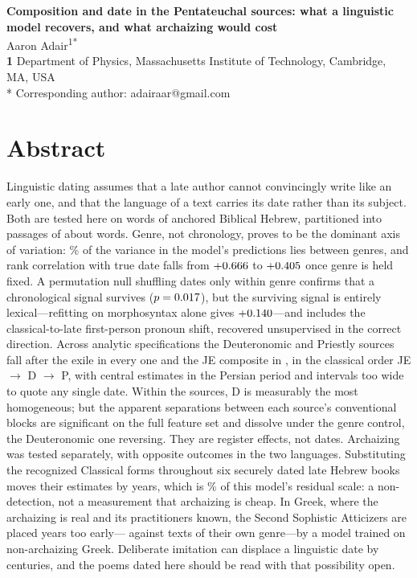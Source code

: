 \documentclass[10pt,letterpaper]{article}
\begin{document}
\vspace*{0.2in}

\begin{flushleft}
{\Large
\textbf{Composition and date in the Pentateuchal sources: what a linguistic
model recovers, and what archaizing would cost}
}
\newline
\\
Aaron Adair\textsuperscript{1*}
\\
\bigskip
\textbf{1} Department of Physics, Massachusetts Institute of Technology, Cambridge, MA, USA
\\
\bigskip
* Corresponding author: adairaar@gmail.com

\end{flushleft}

\section*{Abstract}

Linguistic dating assumes that a late author cannot convincingly write like an
early one, and that the language of a text carries its date rather than its
subject.  Both are tested here on \HBwords{} words of anchored Biblical Hebrew,
partitioned into \HBchunks{} passages of about \HBtarget{} words.  Genre, not chronology, proves to be the dominant axis
of variation: \GNbetween\% of the variance in the model's predictions lies
between genres, and rank correlation with true date falls from $+0.666$ to
$+0.405$ once genre is held fixed.  A permutation null shuffling dates
only within genre confirms that a chronological signal survives ($p =
0.017$), but the surviving signal is entirely lexical---refitting on
morphosyntax alone gives $+0.140$---and includes the classical-to-late
first-person pronoun shift, recovered unsupervised in the correct direction.
Across \SPpass{} analytic specifications the Deuteronomic and Priestly sources
fall after the exile in every one and the JE composite in \SPJEpost, in the
classical order JE $\rightarrow$ D $\rightarrow$ P, with central estimates in
the Persian period and intervals too wide to quote any single date.  Within the sources, D is measurably the most homogeneous; but the apparent
separations between each source's conventional blocks are significant on the
full feature set and dissolve under the genre control, the Deuteronomic one
reversing.  They are register effects, not dates.  Archaizing was tested separately, with opposite outcomes in
the two languages.  Substituting the recognized Classical forms throughout six
securely dated late Hebrew books moves their estimates by \arcMeanAbs{} years,
which is \DETpct\% of this model's residual scale: a non-detection, not a
measurement that archaizing is cheap.  In Greek, where the archaizing
is real and its practitioners known, the Second Sophistic Atticizers are placed
\GKattshiftAbs{} years too early---\GKwithinAbs{} against texts of their own
genre---by a model trained on non-archaizing Greek.  Deliberate imitation can displace a
linguistic date by centuries, and the poems dated here should be read with that
possibility open.
\end{document}
